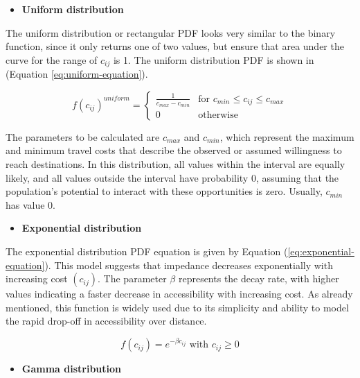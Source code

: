 \documentclass[preprint, 3p,
authoryear]{elsarticle} %
\providecommand{\tightlist}{%
  \setlength{\itemsep}{0pt}\setlength{\parskip}{0pt}}
\begin{document}
\begin{itemize}
\tightlist
\item
  \textbf{Uniform distribution}
\end{itemize}

The uniform distribution or rectangular PDF looks very similar to the
binary function, since it only returns one of two values, but ensure
that area under the curve for the range of \(c_{ij}\) is 1. The uniform
distribution PDF is shown in (Equation \ref{eq:uniform-equation}).

\begin{equation}
f(c_{ij})^{uniform} =
\begin{cases}
  \frac{1}{c_{max} - c_{min}} & \text{for } c_{min} \le c_{ij} \le c_{max} \\
  0 & \text{otherwise}
\end{cases}
\label{eq:uniform-equation}
\end{equation}

The parameters to be calculated are \(c_{max}\) and \(c_{min}\), which
represent the maximum and minimum travel costs that describe the
observed or assumed willingness to reach destinations. In this
distribution, all values within the interval are equally likely, and all
values outside the interval have probability 0, assuming that the
population's potential to interact with these opportunities is zero.
Usually, \(c_{min}\) has value 0.

\begin{itemize}
\tightlist
\item
  \textbf{Exponential distribution}
\end{itemize}

The exponential distribution PDF equation is given by Equation
(\ref{eq:exponential-equation}). This model suggests that impedance
decreases exponentially with increasing cost \((c_{ij})\). The parameter
\(\beta\) represents the decay rate, with higher values indicating a
faster decrease in accessibility with increasing cost. As already
mentioned, this function is widely used due to its simplicity and
ability to model the rapid drop-off in accessibility over distance.

\begin{equation}
f(c_{ij}) = e^{-\beta c_{ij}} \text{ with } c_{ij} \ge 0
\label{eq:exponential-equation}
\end{equation}

\begin{itemize}
\tightlist
\item
  \textbf{Gamma distribution}
\end{itemize}
\end{document}
